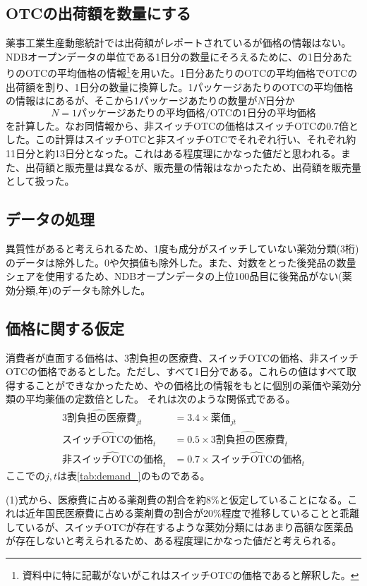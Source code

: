 \documentclass[a4paper,11pt,uplatex]{jsarticle}
\theoremstyle{definition}
\begin{document}
\subsection{OTCの出荷額を数量にする}
薬事工業生産動態統計では出荷額がレポートされているが価格の情報はない。NDBオープンデータの単位である1日分の数量にそろえるために、\cite{igarashi2021}の1日分あたりのOTCの平均価格の情報\footnote{資料中に特に記載がないがこれはスイッチOTCの価格であると解釈した。}を用いた。1日分あたりのOTCの平均価格でOTCの出荷額を割り、1日分の数量に換算した。1パッケージあたりのOTCの平均価格の情報は\cite{iseikyoku2021}にあるが、そこから1パッケージあたりの数量が\(N\)日分か
\[N= \textrm{1パッケージあたりの平均価格}/\textrm{OTCの1日分の平均価格}\]
を計算した。なお同情報から、非スイッチOTCの価格はスイッチOTCの0.7倍とした。この計算はスイッチOTCと非スイッチOTCでそれぞれ行い、それぞれ約11日分と約13日分となった。これはある程度理にかなった値だと思われる。また、出荷額と販売量は異なるが、販売量の情報はなかったため、出荷額を販売量として扱った。
\subsection{データの処理}\label{sec:data_process}
異質性があると考えられるため、1度も成分がスイッチしていない薬効分類(3桁)のデータは除外した。0や欠損値も除外した。また、対数をとった後発品の数量シェアを使用するため、NDBオープンデータの上位100品目に後発品がない(薬効分類,年)のデータも除外した。
\subsection{価格に関する仮定}
消費者が直面する価格は、3割負担の医療費、スイッチOTCの価格、非スイッチOTCの価格であるとした。ただし、すべて1日分である。これらの値はすべて取得することができなかったため、\cite{igarashi2021,igarashi2022}や\cite{iseikyoku2021}の価格比の情報をもとに個別の薬価や薬効分類の平均薬価の定数倍とした。 それは次のような関係式である。
\begin{align}
    \widehat {3割負担の医療費}_{jt}&=3.4\times 薬価_{jt}\\
    \widehat {\textrm{スイッチOTCの価格}}_t&=0.5 \times \widehat{\textrm{3割負担の医療費}}_t\\
    \widehat {\textrm{非スイッチOTCの価格}}_t&=0.7 \times \widehat {\textrm{スイッチOTCの価格}}_t
\end{align}
ここでの\(j,t\)は表\ref{tab:demand_}のものである。

(1)式から、医療費に占める薬剤費の割合を約8\%と仮定していることになる。これは近年国民医療費に占める薬剤費の割合が20\%程度で推移していることと乖離しているが、スイッチOTCが存在するような薬効分類にはあまり高額な医薬品が存在しないと考えられるため、ある程度理にかなった値だと考えられる。
\end{document}
